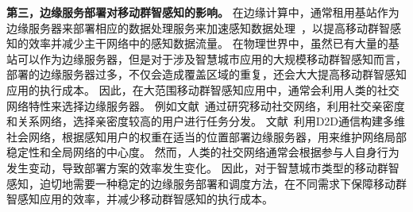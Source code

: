 


\textbf{第三，边缘服务部署对移动群智感知的影响。}
在边缘计算中，通常租用基站作为边缘服务器来部署相应的数据处理服务来加速感知数据处理~\cite{DBLP:journals/fgcs/TarnebergMWTEKE17,DBLP:journals/ton/ChenJLF16,DBLP:conf/IEEEcloud/HabakAHZ15}，以提高移动群智感知的效率并减少主干网络中的感知数据流量。
在物理世界中，虽然已有大量的基站可以作为边缘服务器，但是对于涉及智慧城市应用的大规模移动群智感知而言，部署的边缘服务器过多，不仅会造成覆盖区域的重复，还会大大提高移动群智感知应用的执行成本。
因此，在大范围移动群智感知应用中，通常会利用人类的社交网络特性来选择边缘服务器。
例如文献~\cite{Cnki:Yu2018}通过研究移动社交网络，利用社交亲密度和关系网络，选择亲密度较高的用户进行任务分发。
文献~\cite{DBLP:conf/wasa/Yan0WWW17}利用D2D通信构建多维社会网络，根据感知用户的权重在适当的位置部署边缘服务器，用来维护网络局部稳定性和全局网络的中心度。
然而，人类的社交网络通常会根据参与人自身行为发生变动，导致部署方案的效率发生变化。
因此，对于智慧城市类型的移动群智感知，迫切地需要一种稳定的边缘服务部署和调度方法，在不同需求下保障移动群智感知应用的效率，并减少移动群智感知的执行成本。

